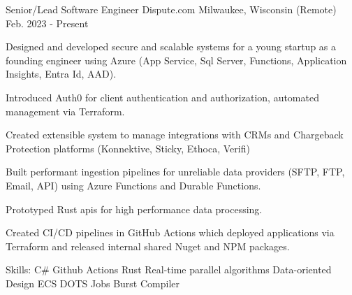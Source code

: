 

\begin{cventries}

  \cventry
    {Senior/Lead Software Engineer} %
    {Dispute.com} %
    {Milwaukee, Wisconsin (Remote)} %
    {Feb. 2023 - Present} %
    {
      \begin{cvitems} %
        \item {Designed and developed secure and scalable systems for a young startup as a founding engineer using Azure (App Service, Sql Server, Functions, Application Insights, Entra Id, AAD).}
        \item {Introduced Auth0 for client authentication and authorization, automated management via Terraform.}
        \item {Created extensible system to manage integrations with CRMs and Chargeback Protection platforms (Konnektive, Sticky, Ethoca, Verifi)}
        \item {Built performant ingestion pipelines for unreliable data providers (SFTP, FTP, Email, API) using Azure Functions and Durable Functions.}
        \item {Prototyped Rust apis for high performance data processing.}
        \item {Created CI/CD pipelines in GitHub Actions which deployed applications via Terraform and released internal shared Nuget and NPM packages.}
        \item {Skills: C\# \textbullet{} Github Actions \textbullet{} Rust \textbullet{} Real-time parallel algorithms \textbullet{} Data-oriented Design \textbullet{} ECS \textbullet{} DOTS \textbullet{} Jobs \textbullet{} Burst Compiler}
      \end{cvitems}
    }


\end{cventries}
